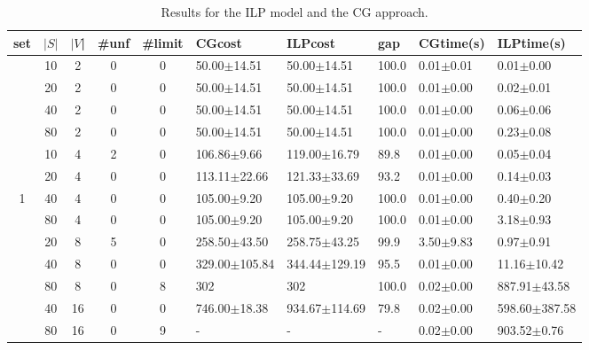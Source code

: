 \documentclass{llncs}
\begin{document}
\begin{table}[h]
\begin{center}
  \caption{Results for the ILP model and the CG approach. \label{tab:com1}}
  \begin{tabular}{c c c| c c l l l l l}
set &$|S|$ & $|V$| &  \#unf & \#limit & CGcost           &   ILPcost   &  gap   &  CGtime(s)        &  ILPtime(s)    \\
\hline
&10 & 2    & 0 & 0 &  50.00$\pm$14.51       &  50.00$\pm$14.51    &  100.0      &  0.01$\pm$0.01     &  0.01$\pm$0.00         \\
&20 & 2    & 0 & 0 &  50.00$\pm$14.51       &  50.00$\pm$14.51    &  100.0      &  0.01$\pm$0.00     &  0.02$\pm$0.01         \\
&40 & 2    & 0 & 0 &  50.00$\pm$14.51       &  50.00$\pm$14.51    &  100.0      &  0.01$\pm$0.00     &  0.06$\pm$0.06         \\
&80 & 2    & 0 & 0 &  50.00$\pm$14.51       &  50.00$\pm$14.51    &  100.0      &  0.01$\pm$0.00     &  0.23$\pm$0.08         \\
&10 & 4    & 2 & 0 &  106.86$\pm$9.66       &  119.00$\pm$16.79   &  89.8       &  0.01$\pm$0.00     &  0.05$\pm$0.04         \\
&20 & 4    & 0 & 0 &  113.11$\pm$22.66      &  121.33$\pm$33.69   &  93.2       &  0.01$\pm$0.00     &  0.14$\pm$0.03         \\
1&40 & 4   & 0 & 0 &  105.00$\pm$9.20       &  105.00$\pm$9.20     &  100.0     &  0.01$\pm$0.00     &  0.40$\pm$0.20         \\
&80 & 4    & 0 & 0 &  105.00$\pm$9.20       &  105.00$\pm$9.20    &  100.0      &  0.01$\pm$0.00     &  3.18$\pm$0.93         \\
&20 & 8    & 5 & 0 &  258.50$\pm$43.50      &  258.75$\pm$43.25   &  99.9       &  3.50$\pm$9.83     &  0.97$\pm$0.91         \\
&40 & 8    & 0 & 0 &  329.00$\pm$105.84     &  344.44$\pm$129.19  &  95.5       &  0.01$\pm$0.00     &  11.16$\pm$10.42       \\
&80 & 8    & 0 & 8 &  302                   &  302                &  100.0      &  0.02$\pm$0.00     &  887.91$\pm$43.58      \\
&40 & 16   & 0 & 0 &  746.00$\pm$18.38      &  934.67$\pm$114.69  &  79.8       &  0.02$\pm$0.00     &  598.60$\pm$387.58     \\
&80 & 16   & 0 & 9 &  -                     &  -                  &  -           &  0.02$\pm$0.00     &  903.52$\pm$0.76       \\

\end{tabular}
\end{center}
\end{table}
\end{document}
